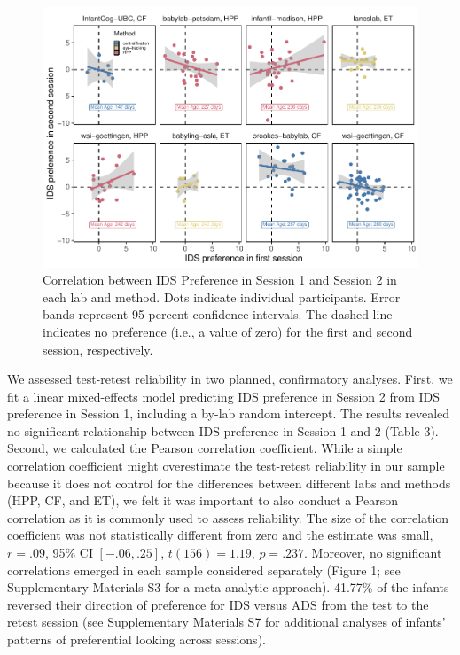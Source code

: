 \documentclass[
  man,floatsintext]{apa6}
\begin{document}
\begin{figure}

{\centering \includegraphics{Retest_current_draft_files/figure-latex/unnamed-chunk-5-1} 

}

\caption{Correlation between IDS Preference in Session 1 and Session 2 in each lab and method. Dots indicate individual participants. Error bands represent 95 percent confidence intervals. The dashed line indicates no preference (i.e., a value of zero) for the first and second session, respectively.}\label{fig:unnamed-chunk-5}
\end{figure}

We assessed test-retest reliability in two planned, confirmatory analyses.
First, we fit a linear mixed-effects model predicting IDS preference in Session 2 from IDS preference in Session 1, including a by-lab random intercept.
The results revealed no significant relationship between IDS preference in Session 1 and 2 (Table 3).
Second, we calculated the Pearson correlation coefficient.
While a simple correlation coefficient might overestimate the test-retest reliability in our sample because it does not control for the differences between different labs and methods (HPP, CF, and ET), we felt it was important to also conduct a Pearson correlation as it is commonly used to assess reliability.
The size of the correlation coefficient was not statistically different from zero and the estimate was small, \(r = .09\), 95\% CI \([-.06, .25]\), \(t(156) = 1.19\), \(p = .237\).
Moreover, no significant correlations emerged in each sample considered separately (Figure 1; see Supplementary Materials S3 for a meta-analytic approach).
41.77\% of the infants reversed their direction of preference for IDS versus ADS from the test to the retest session (see Supplementary Materials S7 for additional analyses of infants' patterns of preferential looking across sessions).
\end{document}
